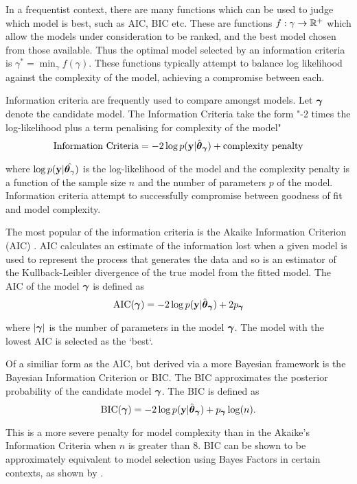In a frequentist context, there are many functions which can be used to judge which model is best,
such as AIC, BIC etc. These are functions $f: \gamma \to {\mathbb{R}}^+$ which allow the models under consideration to
be ranked, and the best model chosen from those available. Thus the optimal model selected by an information
criteria is	$\gamma^* = \min_\gamma f(\gamma)$. These functions typically attempt to balance log likelihood 
against the complexity of the model, achieving a compromise between each.


Information criteria are frequently used to compare amongst models. Let ${\boldsymbol \gamma}$ denote the candidate model.
The Information Criteria take the form "-2 times the log-likelihood plus a term penalising for complexity of
the model"
\[
	\text{Information Criteria} = -2 \log p({\bf y} | \hat{{\boldsymbol \theta}}_{\boldsymbol \gamma}) + \text{complexity penalty}
\]

where $\log p({\bf y} | \hat{{\boldsymbol \theta}_\gamma})$ is the log-likelihood of the model and the complexity penalty is
a function of the sample size $n$ and the number of parameters $p$ of the model. Information criteria attempt
to successfully compromise between goodness of fit and model complexity.

The most popular of the information criteria is the Akaike Information Criterion (AIC) \cite{Akaike1974}. AIC
calculates an estimate of the information lost when a given model is used to represent the process that
generates the data and so is an estimator of the Kullback-Leibler divergence of the true model from the fitted
model. The AIC of the model ${\boldsymbol \gamma}$ is defined as
\[
	\text{AIC}({\boldsymbol \gamma}) = -2 \log p({\bf y} | \hat{{\boldsymbol \theta}}_{\boldsymbol \gamma}) + 2 p_{\boldsymbol \gamma}
\]

where $|{\boldsymbol \gamma}|$ is the number of parameters in the model ${\boldsymbol \gamma}$. The model with the lowest AIC is selected
as the `best`.

Of a similiar form as the AIC, but derived via a more Bayesian framework is the Bayesian Information Criterion
or BIC. The BIC approximates the posterior probability of the candidate model ${\boldsymbol \gamma}$. The BIC is defined as
\[
	\text{BIC}({\boldsymbol \gamma}) = -2 \log p({\bf y} | \hat{{\boldsymbol \theta}}_{\boldsymbol \gamma}) + p_{\boldsymbol \gamma} \log(n).
\]

This is a more severe penalty for model complexity than in the Akaike's Information Criteria when $n$ is
greater than $8$. BIC can be shown to be approximately equivalent to model selection using Bayes Factors
in certain contexts, as shown by \cite{Kass1993}.

